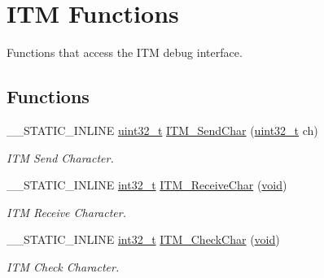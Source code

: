 \hypertarget{group___c_m_s_i_s__core___debug_functions}{\section{I\-T\-M Functions}
\label{group___c_m_s_i_s__core___debug_functions}
}


Functions that access the I\-T\-M debug interface.  


\subsection*{Functions}
\begin{DoxyCompactItemize}
\item 
\-\_\-\-\_\-\-S\-T\-A\-T\-I\-C\-\_\-\-I\-N\-L\-I\-N\-E \hyperlink{stdint_8h_a435d1572bf3f880d55459d9805097f62}{uint32\-\_\-t} \hyperlink{group___c_m_s_i_s__core___debug_functions_gac90a497bd64286b84552c2c553d3419e}{I\-T\-M\-\_\-\-Send\-Char} (\hyperlink{stdint_8h_a435d1572bf3f880d55459d9805097f62}{uint32\-\_\-t} ch)
\begin{DoxyCompactList}\small\item\em I\-T\-M Send Character. \end{DoxyCompactList}\item 
\-\_\-\-\_\-\-S\-T\-A\-T\-I\-C\-\_\-\-I\-N\-L\-I\-N\-E \hyperlink{group___n_a_m_e_gafd12020da5a235dfcf0c3c748fb5baed}{int32\-\_\-t} \hyperlink{group___c_m_s_i_s__core___debug_functions_gac3ee2c30a1ac4ed34c8a866a17decd53}{I\-T\-M\-\_\-\-Receive\-Char} (\hyperlink{group___n_a_m_e_ga18028b8badbf1ea7e704ccac3c488e82}{void})
\begin{DoxyCompactList}\small\item\em I\-T\-M Receive Character. \end{DoxyCompactList}\item 
\-\_\-\-\_\-\-S\-T\-A\-T\-I\-C\-\_\-\-I\-N\-L\-I\-N\-E \hyperlink{group___n_a_m_e_gafd12020da5a235dfcf0c3c748fb5baed}{int32\-\_\-t} \hyperlink{group___c_m_s_i_s__core___debug_functions_gae61ce9ca5917735325cd93b0fb21dd29}{I\-T\-M\-\_\-\-Check\-Char} (\hyperlink{group___n_a_m_e_ga18028b8badbf1ea7e704ccac3c488e82}{void})
\begin{DoxyCompactList}\small\item\em I\-T\-M Check Character. \end{DoxyCompactList}\end{DoxyCompactItemize}
